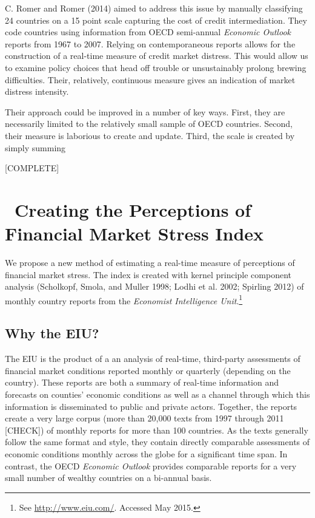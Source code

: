 \documentclass[]{article}
\let\rmarkdownfootnote\footnote%
\def\footnote{\protect\rmarkdownfootnote}
\begin{document}
C. Romer and Romer (2014) aimed to address this issue by manually
classifying 24 countries on a 15 point scale capturing the cost of
credit intermediation. They code countries using information from OECD
semi-annual \emph{Economic Outlook} reports from 1967 to 2007. Relying
on contemporaneous reports allows for the construction of a real-time
measure of credit market distress. This would allow us to examine policy
choices that head off trouble or unsustainably prolong brewing
difficulties. Their, relatively, continuous measure gives an indication
of market distress intensity.

Their approach could be improved in a number of key ways. First, they
are necessarily limited to the relatively small sample of OECD
countries. Second, their measure is laborious to create and update.
Third, the scale is created by simply summing

{[}COMPLETE{]}

\section{~Creating the Perceptions of Financial Market Stress
Index}\label{creating-the-perceptions-of-financial-market-stress-index}

We propose a new method of estimating a real-time measure of perceptions
of financial market stress. The index is created with kernel principle
component analysis (Scholkopf, Smola, and Muller 1998; Lodhi et al.
2002; Spirling 2012) of monthly country reports from the \emph{Economist
Intelligence Unit}.\footnote{See \url{http://www.eiu.com/}. Accessed May
  2015.}

\subsection{Why the EIU?}\label{why-the-eiu}

The EIU is the product of a an analysis of real-time, third-party
assessments of financial market conditions reported monthly or quarterly
(depending on the country). These reports are both a summary of
real-time information and forecasts on counties' economic conditions as
well as a channel through which this information is disseminated to
public and private actors. Together, the reports create a very large
corpus (more than 20,000 texts from 1997 through 2011 {[}CHECK{]}) of
monthly reports for more than 100 countries. As the texts generally
follow the same format and style, they contain directly comparable
assessments of economic conditions monthly across the globe for a
significant time span. In contrast, the OECD \emph{Economic Outlook}
provides comparable reports for a very small number of wealthy countries
on a bi-annual basis.
\end{document}
